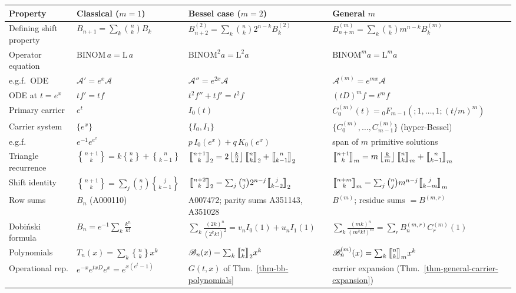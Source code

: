 \documentclass[a4paper]{amsart}
\numberwithin{equation}{section}
\newcommand{\Stirling}[0]{\genfrac\{\}{0pt}{}}
\newcommand{\mStirling}[0]{\genfrac{\llbracket}{\rrbracket}{0pt}{}}
\newcommand{\floor}[1]{\left\lfloor #1 \right\rfloor}
\begin{document}
\begin{landscape}
\begin{table}[h]
\centering
\small
\renewcommand{\arraystretch}{1.9}
\begin{tabular}{|p{4.2cm}|p{5.2cm}|p{6.4cm}|p{6.6cm}|}
\hline
\textbf{Property} & \textbf{Classical ($m=1$)} & \textbf{Bessel case ($m=2$)} & \textbf{General $m$} \\
\hline
Defining shift property & $B_{n+1} = \sum_k \binom{n}{k}B_k$ & $B^{(2)}_{n+2} = \sum_k \binom{n}{k}2^{n-k}B^{(2)}_k$ & $B^{(m)}_{n+m} = \sum_k \binom{n}{k}m^{n-k}B^{(m)}_k$ \\
Operator equation & $\mathrm{BINOM}\, a = \mathrm{L}\, a$ & $\mathrm{BINOM}^2 a = \mathrm{L}^2 a$ & $\mathrm{BINOM}^m a = \mathrm{L}^m a$ \\
e.g.f.\ ODE & $\mathcal{A}' = e^x \mathcal{A}$ & $\mathcal{A}'' = e^{2x}\mathcal{A}$ & $\mathcal{A}^{(m)} = e^{mx}\mathcal{A}$ \\
ODE at $t=e^x$ & $tf' = tf$ & $t^2f''+tf' = t^2f$ & $(tD)^m f = t^m f$ \\
Primary carrier & $e^t$ & $I_0(t)$ & $C^{(m)}_0(t) = {}_0F_{m-1}(;1,\ldots,1;(t/m)^m)$ \\
Carrier system & $\{e^x\}$ & $\{I_0, I_1\}$ & $\{C^{(m)}_0,\ldots,C^{(m)}_{m-1}\}$ (hyper-Bessel) \\
e.g.f. & $e^{-1}e^{e^x}$ & $p\,I_0(e^x) + q\,K_0(e^x)$ & span of $m$ primitive solutions \\
Triangle recurrence & $\Stirling{n+1}{k} = k\Stirling{n}{k}+\Stirling{n}{k-1}$ & $\mStirling{n+1}{k}_2 = 2\floor{\frac{k}{2}}\mStirling{n}{k}_2+\mStirling{n}{k-1}_2$ & $\mStirling{n+1}{k}_m = m\floor{\frac{k}{m}}\mStirling{n}{k}_m+\mStirling{n}{k-1}_m$ \\
Shift identity & $\Stirling{n+1}{k} = \sum_j \binom{n}{j}\Stirling{j}{k-1}$ & $\mStirling{n+2}{k}_2 = \sum_j \binom{n}{j}2^{n-j}\mStirling{j}{k-2}_2$ & $\mStirling{n+m}{k}_m = \sum_j \binom{n}{j}m^{n-j}\mStirling{j}{k-m}_m$ \\
Row sums & $B_n$ (A000110) & A007472; parity sums A351143, A351028 & $B^{(m)}$; residue sums $= B^{(m,r)}$ \\
Dobi\'nski formula & $B_n = e^{-1}\sum_k \frac{k^n}{k!}$ & $\sum_k \frac{(2k)^n}{(2^kk!)^2} = v_nI_0(1)+u_nI_1(1)$ & $\sum_k \frac{(mk)^n}{(m^kk!)^m} = \sum_r B^{(m,r)}_n C^{(m)}_r(1)$ \\
Polynomials & $T_n(x) = \sum_k \Stirling{n}{k}x^k$ & $\mathscr{B}_n(x) = \sum_k \mStirling{n}{k}_2x^k$ & $\mathscr{B}^{(m)}_n(x) = \sum_k \mStirling{n}{k}_mx^k$ \\
Operational rep. & $e^{-x}e^{txD}e^x = e^{x(e^t-1)}$ & $G(t,x)$ of Thm.\ \ref{thm-bb-polynomials} & carrier expansion (Thm.\ \ref{thm-general-carrier-expansion}) \\

\end{tabular}
\end{table}
\end{landscape}
\end{document}
